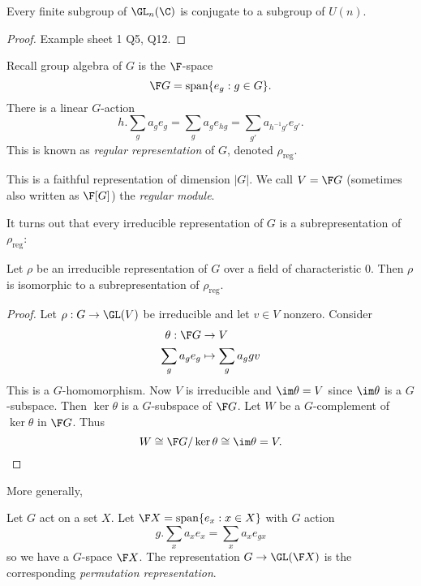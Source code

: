 \documentclass[a4paper]{article}
\theoremstyle{definition}
\begin{document}
\begin{corollary}
  Every finite subgroup of \(\GL_n(\C)\) is conjugate to a subgroup of \(U(n)\).
\end{corollary}

\begin{proof}
  Example sheet 1 Q5, Q12.
\end{proof}

\begin{definition}
  Recall group algebra of \(G\) is the \(\F\)-space
  \[
    \F G = \text{span} \{e_g: g \in G\}.
  \]
  There is a linear \(G\)-action
  \[
    h . \sum_g a_ge_g = \sum_g a_g e_{hg} = \sum_{g'} a_{h^{-1}g'} e_{g'}.
  \]
  This is known as \emph{regular representation} of \(G\), denoted \(\rho_{\text{reg}}\).
\end{definition}

This is a faithful representation of dimension \(|G|\). We call \(V = \F G\) (sometimes also written as \(\F[G]\)) the \emph{regular module}.

It turns out that every irreducible representation of \(G\) is a subrepresentation of \(\rho_{\text{reg}}\):

\begin{proposition}
  Let \(\rho\) be an irreducible representation of \(G\) over a field of characteristic \(0\). Then \(\rho\) is isomorphic to a subrepresentation of \(\rho_{\text{reg}}\).
\end{proposition}

\begin{proof}
  Let \(\rho: G \to \GL(V)\) be irreducible and let \(v \in V\) nonzero. Consider
  \begin{align*}
    \theta: \F G &\to V \\
    \sum_g a_g e_g &\mapsto \sum_g a_g gv
  \end{align*}
  This is a \(G\)-homomorphism. Now \(V\) is irreducible and \(\im \theta = V\) since \(\im \theta\) is a \(G\)-subspace. Then \(\ker \theta\) is a \(G\)-subspace of \(\F G\). Let \(W\) be a \(G\)-complement of \(\ker \theta\) in \(\F G\). Thus
  \[
    W \cong \F G/ \ker \theta \cong \im \theta = V.
  \]
\end{proof}

More generally,

\begin{definition}
  Let \(G\) act on a set \(X\). Let \(\F X = \text{span}\{e_x: x \in X\}\) with \(G\) action
  \[
    g . \sum_x a_x e_x = \sum_x a_x e_{gx}
  \]
  so we have a \(G\)-space \(\F X\). The representation \(G \to \GL(\F X)\) is the corresponding \emph{permutation representation}.
\end{definition}
\end{document}
